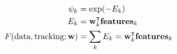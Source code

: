 \begin{frame}
\begin{center}
\begin{tikzpicture}[scale=0.5, every node/.append style={transform shape}]
        \end{tikzpicture}
    \end{center}
    \begin{align}
        \psi_{k} &= \exp(-E_{k}) \\ \nonumber
        E_{k} &= \dualvec{w}_{k}\VEC{\text{features}}_k \\ \nonumber
        F(\text{data}, \text{tracking}; \VEC{w}) &= \sum_k E_k = \dualvec{w}_k\VEC{\text{features}}_k
    \end{align}

\end{frame}






